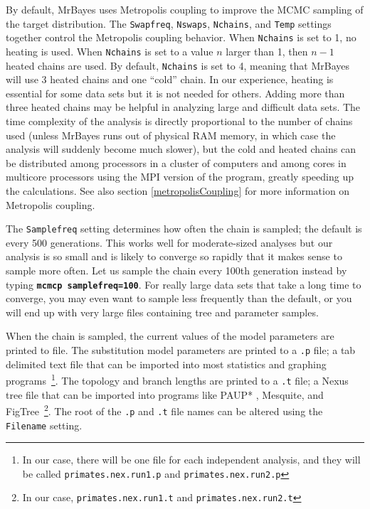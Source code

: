 \documentclass[12pt]{book}
\newcommand{\ttt}[1]{\texttt{#1}}
\newcommand{\tb}[1]{\ttt{\textbf{#1}}}
\begin{document}
By default, MrBayes uses Metropolis coupling to improve the MCMC sampling of the target
distribution. The \ttt{Swapfreq}, \ttt{Nswaps}, \ttt{Nchains}, and \ttt{Temp} settings together
control the Metropolis coupling behavior. When \ttt{Nchains} is set to 1, no heating is used. When
\ttt{Nchains} is set to a value $n$ larger than 1, then $n - 1$ heated chains are used. By default,
\ttt{Nchains} is set to 4, meaning that MrBayes will use 3 heated chains and one ``cold'' chain. In
our experience, heating is essential for some data sets but it is not needed for others. Adding
more than three heated chains may be helpful in analyzing large and difficult data sets. The time
complexity of the analysis is directly proportional to the number of chains used (unless MrBayes
runs out of physical RAM memory, in which case the analysis will suddenly become much slower), but
the cold and heated chains can be distributed among processors in a cluster of computers and among
cores in multicore processors using the MPI version of the program, greatly speeding up the
calculations. See also section \ref{metropolisCoupling} for more information on Metropolis coupling.

The \ttt{Samplefreq} setting determines how often the chain is sampled; the default is every 500
generations. This works well for moderate-sized analyses but our analysis is so small and is likely
to converge so rapidly that it makes sense to sample more often. Let us sample the chain every
100th generation instead by typing \tb{mcmcp samplefreq=100}. For really large data sets that take
a long time to converge, you may even want to sample less frequently than the default, or you will
end up with very large files containing tree and parameter samples.

When the chain is sampled, the current values of the model parameters are printed to file. The
substitution model parameters are printed to a \ttt{.p} file; a tab delimited text file that can be 
imported into most statistics and graphing programs~\footnote{In our case, there will be one file
for each independent analysis, and they will be called \ttt{primates.nex.run1.p} and
\ttt{primates.nex.run2.p}}. The topology and branch lengths are printed to a
\ttt{.t} file; a Nexus tree file that can be imported into
programs like PAUP* \citep{swofford98}, Mesquite, and FigTree~\footnote{In our case, \ttt{primates.nex.run1.t} and
\ttt{primates.nex.run2.t}}. The root of the \ttt{.p} and
\ttt{.t} file names can be altered using the \ttt{Filename} setting.
\end{document}
